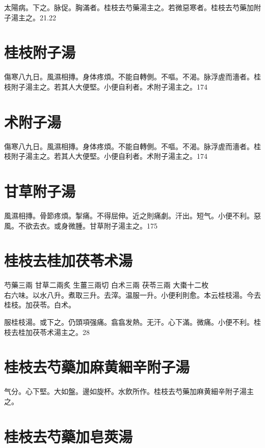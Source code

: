 \documentclass[12pt,twoside,UTF8,b5paper]{ctexbook}
\begin{document}
太陽病。下之。脉促。胸滿者。桂枝去芍藥湯主之。若微{惡}寒者。桂枝去芍藥加附子湯主之。21.22

\section{桂枝附子湯}

傷寒八九日。風濕相摶。身体疼煩。不能自轉側。不嘔。不渴。脉浮虗而濇者。桂枝附子湯主之。若其人大便堅。小便自利者。术附子湯主之。174

\section{术附子湯}

傷寒八九日。風濕相摶。身体疼煩。不能自轉側。不嘔。不渴。脉浮虗而濇者。桂枝附子湯主之。若其人大便堅。小便自利者。术附子湯主之。174

\section{甘草附子湯}

風濕相摶。骨節疼煩。掣痛。不得屈伸。近之則痛劇。汗出。短气。小便不利。惡風。不欲去衣。或身微腫。甘草附子湯主之。175

\section{桂枝去桂加茯苓术湯}

芍藥{\scriptsize 三兩} 甘草{\scriptsize 二兩炙} 生薑{\scriptsize 三兩切} 白术{\scriptsize 三兩} 茯苓{\scriptsize 三兩} 大棗{\scriptsize 十二枚}\\
右六味。以水八升。煮取三升。去滓。温服一升。小便利則愈。本云桂枝湯。今去桂枝。加茯苓。白术。

服桂枝湯。{或}下之。仍頭項强痛。翕翕发熱。无汗。心下滿。微痛。小便不利。桂枝去桂加茯苓术湯主之。28

\section{桂枝去芍藥加麻黄細辛附子湯}

气分。心下堅。大如盤。邊如旋杯。水飲所作。桂枝去芍藥加麻黄細辛附子湯主之。

\section{桂枝去芍藥加皂莢湯}
\end{document}
